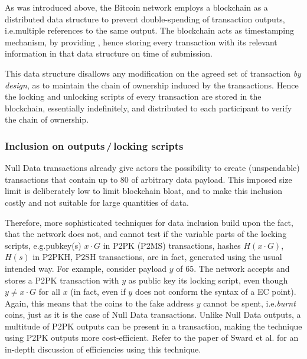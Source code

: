 \documentclass[a4paper,11pt,titlepage]{scrbook}
\begin{document}
As was introduced above, the Bitcoin network employs a blockchain as a distributed data structure to prevent double-spending of transaction outputs, i.e.\@ multiple references to the same output.
The blockchain acts as timestamping mechanism, by providing , hence storing every transaction with its relevant information in that data structure on time of submission.

This data structure disallows any modification on the agreed set of transaction \emph{by design}, 
as to maintain the chain of ownership induced by the transactions.
Hence the locking and unlocking scripts of every transaction are stored in the blockchain, essentially indefinitely, and distributed to each participant to verify the chain of ownership.

\subsubsection*{Inclusion on outputs\,/\,locking scripts}

Null Data transactions already give actors the possibility to create (unspendable) transactions that contain up to \SI{80}{\byte} of arbitrary data payload. This imposed size limit is deliberately low to limit blockchain bloat, and to make this inclusion costly and not suitable for large quantities of data. \cite[Cf.][155--156]{antonopoulos_mastering_2017}

Therefore, more sophisticated techniques for data inclusion build upon the fact, that the network does not, and cannot test if the variable parts of the locking scripts, e.g.\@ pubkey(s) $x\cdot G$ in P2PK (P2MS) transactions, hashes $H(x\cdot G)$, $H(s)$ in P2PKH, P2SH transactions, are in fact, generated using the usual intended way.
For example, consider payload $y$ of \SI{65}{\byte}.
The network accepts and stores a P2PK transaction with $y$ as  public key its locking script, even though $y\neq x\cdot G$ for all $x$ (in fact, even if $y$ does not conform the syntax of a EC point).
Again, this means that the coins  to the fake address $y$ cannot be spent, i.e.\@ \emph{burnt} coins, just as it is the case of Null Data transactions.
Unlike Null Data outputs, a multitude of P2PK outputs can be present in a transaction, making the technique using P2PK outputs more cost-efficient.
Refer to the paper of Sward et al.\@ \cite{sward_data_2018} for an in-depth discussion of efficiencies using this technique.
\end{document}
